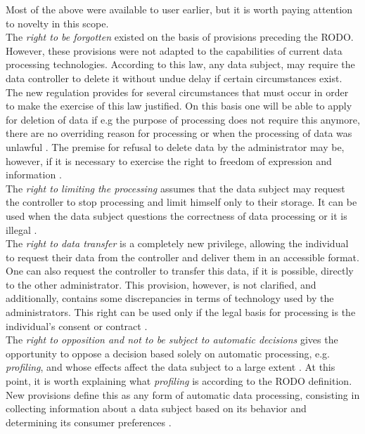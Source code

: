 \documentclass[en, noamssymb]{mgr}
\begin{document}
Most of the above were available to user earlier, but it is worth paying attention to novelty in this scope.\\
\indent The \textit{right to be forgotten} existed on the basis of provisions preceding the RODO. However, these provisions were not adapted to the capabilities of current data processing technologies. According to this law, any data subject, may require the data controller to delete it without undue delay if certain circumstances exist. The new regulation provides for several circumstances that must occur in order to make the exercise of this law justified. On this basis one will be able to apply for deletion of data if e.g the purpose of processing does not require this anymore, there are no overriding reason for processing or when the processing of data was unlawful \cite{delloite_prawa_podmiotow}. The premise for refusal to delete data by the administrator may be, however, if it is necessary to exercise the right to freedom of expression and information \cite{delloite_prawa_podmiotow}.\\
\indent The \textit{right to limiting the processing} assumes that the data subject may request the controller to stop processing and limit himself only to their storage. It can be used when the data subject questions the correctness of data processing or it is illegal \cite{delloite_prawa_podmiotow}.\\
\indent The \textit{right to data transfer} is a completely new privilege, allowing the individual to request their data from the controller and deliver them in an accessible format. One can also request the controller to transfer this data, if it is possible, directly to the other administrator. This provision, however, is not clarified, and additionally, contains some discrepancies in terms of technology used by the administrators. This right can be used only if the legal basis for processing is the individual's consent or contract \cite{delloite_prawa_podmiotow}.\\
\indent The \textit{right to opposition and not to be subject to automatic decisions} gives the opportunity to oppose a decision based solely on automatic processing, e.g. \textit{profiling}, and whose effects affect the data subject to a large extent \cite{delloite_prawa_podmiotow}. At this point, it is worth explaining what \textit{profiling} is according to the RODO definition. New provisions define this as any form of automatic data processing, consisting in collecting information about a data subject based on its behavior and determining its consumer preferences \cite{rodo_art4}.
\end{document}
